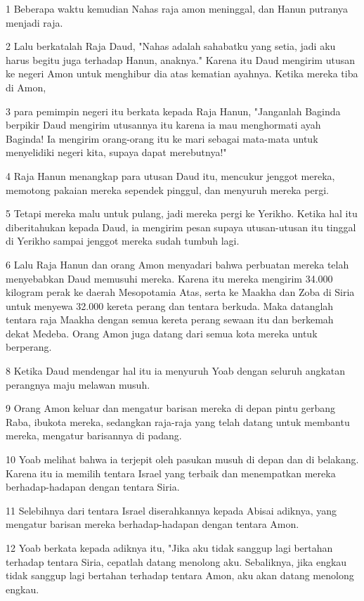 \par 1 Beberapa waktu kemudian Nahas raja amon meninggal, dan Hanun putranya menjadi raja.
\par 2 Lalu berkatalah Raja Daud, "Nahas adalah sahabatku yang setia, jadi aku harus begitu juga terhadap Hanun, anaknya." Karena itu Daud mengirim utusan ke negeri Amon untuk menghibur dia atas kematian ayahnya. Ketika mereka tiba di Amon,
\par 3 para pemimpin negeri itu berkata kepada Raja Hanun, "Janganlah Baginda berpikir Daud mengirim utusannya itu karena ia mau menghormati ayah Baginda! Ia mengirim orang-orang itu ke mari sebagai mata-mata untuk menyelidiki negeri kita, supaya dapat merebutnya!"
\par 4 Raja Hanun menangkap para utusan Daud itu, mencukur jenggot mereka, memotong pakaian mereka sependek pinggul, dan menyuruh mereka pergi.
\par 5 Tetapi mereka malu untuk pulang, jadi mereka pergi ke Yerikho. Ketika hal itu diberitahukan kepada Daud, ia mengirim pesan supaya utusan-utusan itu tinggal di Yerikho sampai jenggot mereka sudah tumbuh lagi.
\par 6 Lalu Raja Hanun dan orang Amon menyadari bahwa perbuatan mereka telah menyebabkan Daud memusuhi mereka. Karena itu mereka mengirim 34.000 kilogram perak ke daerah Mesopotamia Atas, serta ke Maakha dan Zoba di Siria untuk menyewa 32.000 kereta perang dan tentara berkuda. Maka datanglah tentara raja Maakha dengan semua kereta perang sewaan itu dan berkemah dekat Medeba. Orang Amon juga datang dari semua kota mereka untuk berperang.
\par 8 Ketika Daud mendengar hal itu ia menyuruh Yoab dengan seluruh angkatan perangnya maju melawan musuh.
\par 9 Orang Amon keluar dan mengatur barisan mereka di depan pintu gerbang Raba, ibukota mereka, sedangkan raja-raja yang telah datang untuk membantu mereka, mengatur barisannya di padang.
\par 10 Yoab melihat bahwa ia terjepit oleh pasukan musuh di depan dan di belakang. Karena itu ia memilih tentara Israel yang terbaik dan menempatkan mereka berhadap-hadapan dengan tentara Siria.
\par 11 Selebihnya dari tentara Israel diserahkannya kepada Abisai adiknya, yang mengatur barisan mereka berhadap-hadapan dengan tentara Amon.
\par 12 Yoab berkata kepada adiknya itu, "Jika aku tidak sanggup lagi bertahan terhadap tentara Siria, cepatlah datang menolong aku. Sebaliknya, jika engkau tidak sanggup lagi bertahan terhadap tentara Amon, aku akan datang menolong engkau.
